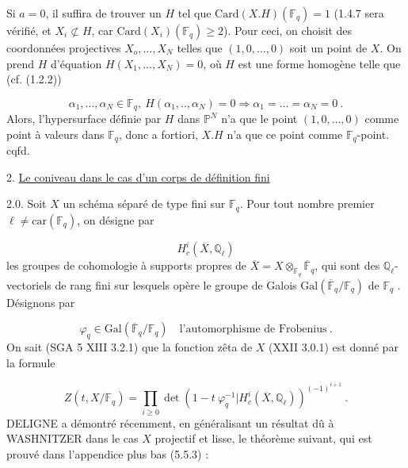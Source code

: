 Si $a = 0$, il suffira de trouver un $H$ tel que $\mathrm{Card}(X.H)(\mathbb{F}_q)=1$ (1.4.7 sera vérifié, et $X_i \not\subset H$, car $\mathrm{Card}(X_i)(\mathbb{F}_q) \geq 2$). Pour ceci, on choisit des coordonnées projectives $X_o,\dots,X_N$ telles que $(1,0,\dots,0)$ soit un point de $X$. On prend $H$ d'équation $H(X_1,\dots,X_N) = 0$, où $H$ est une forme homogène telle que (cf. (1.2.2))

\begin{equation}\tag{1.4.8}
\alpha_1,\dots,\alpha_N \in \mathbb{F}_q, \ H(\alpha_1,..,\alpha_N) = 0 \Longrightarrow \alpha_1=\dots=\alpha_N = 0 \ .
\end{equation}
Alors, l'hypersurface définie par $H$ dans $\mathbb{P}^N$ n'a que le point $(1,0,\dots,0)$ comme point à valeurs dans $\mathbb{F}_q$, donc a fortiori, $X.H$ n'a que ce point comme $\mathbb{F}_q$-point. cqfd.




2. \underline{Le coniveau dans le cas d'un corps de définition fini}

2.0. Soit $X$ un schéma séparé de type fini sur $\mathbb{F}_q$. Pour tout nombre premier $\ell \neq \mathrm{car}(\mathbb{F}_q)$, on désigne par

\begin{equation}\tag{2.0.1}
H^i_c(\overline{X},\mathbb{Q}_\ell)
\end{equation}
les groupes de cohomologie à supports propres de $\overline{X} = X \otimes_{\mathbb{F}_q} \overline{\mathbb{F}}_q$, qui sont des $\mathbb{Q}_\ell$-vectoriels de rang fini sur lesquels opère le groupe de Galois $\mathrm{Gal}(\overline{\mathbb{F}}_q/\mathbb{F}_q)$ de $\mathbb{F}_q$ . Désignons par

\begin{equation}\tag{2.0.2}
\varphi_q \in \mathrm{Gal}(\overline{\mathbb{F}}_q/\mathbb{F}_q) \quad \mbox{l'automorphisme de Frobenius} \ .
\end{equation}
On sait (SGA 5 XIII 3.2.1) que la fonction zêta de $X$ (XXII 3.0.1) est donné par la formule

\begin{equation}\tag{2.0.3}
Z(t,X/\mathbb{F}_q) = \prod_{i \geq 0} \det (1-t\ \varphi_q^{-1}|H^i_c(\overline{X},\mathbb{Q}_\ell))^{(-1)^{i+1}} \ .
\end{equation}
DELIGNE a démontré récemment, en généralisant un résultat dû à WASHNITZER dans le cas $X$ projectif et lisse, le théorème suivant, qui est prouvé dans l'appendice plus bas (5.5.3) :

